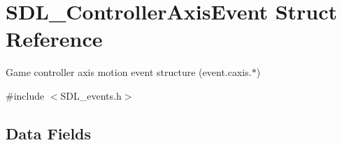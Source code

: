 \hypertarget{struct_s_d_l___controller_axis_event}{}\section{S\+D\+L\+\_\+\+Controller\+Axis\+Event Struct Reference}
\label{struct_s_d_l___controller_axis_event}


Game controller axis motion event structure (event.\+caxis.$\ast$)  




{\ttfamily \#include $<$S\+D\+L\+\_\+events.\+h$>$}

\subsection*{Data Fields}
